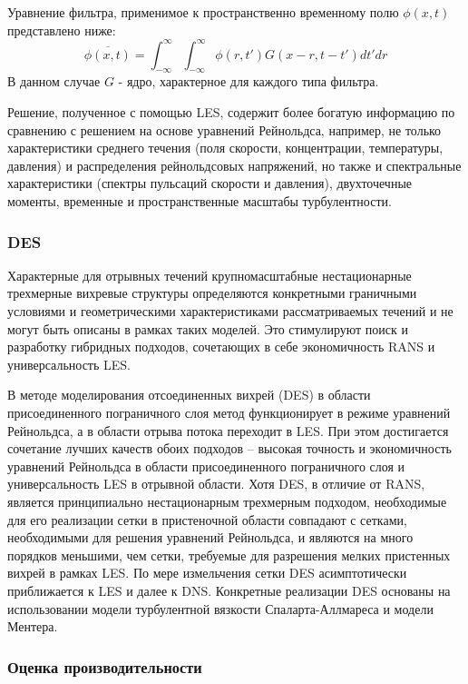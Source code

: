 \documentclass[a4paper]{article}
\begin{document}
		Уравнение фильтра, применимое к пространственно временному полю $\phi(x,t)$ представлено ниже:
		\begin{equation}
			\overline{\phi(x,t)} = \int_{-\infty}^{\infty}\int_{-\infty}^{\infty}\phi(r,t')G(x - r, t - t')dt'dr
		\end{equation}
		В данном случае $G$ - ядро, характерное для каждого типа фильтра.
	
		Решение, полученное с помощью LES, содержит более богатую информацию по сравнению с решением на основе уравнений Рейнольдса, например, не только характеристики среднего течения (поля скорости, концентрации, температуры, давления) и распределения рейнольдсовых напряжений, но также и спектральные характеристики (спектры пульсаций скорости и давления), двухточечные моменты, временные и пространственные масштабы турбулентности.
	
	\subsubsection{DES}
	
		Характерные для отрывных течений крупномасштабные нестационарные трехмерные вихревые структуры определяются конкретными граничными условиями и геометрическими характеристиками рассматриваемых течений и не могут быть описаны в рамках таких моделей. Это стимулируют поиск и разработку гибридных подходов, сочетающих в себе экономичность RANS и универсальность LES.
		
		В методе моделирования отсоединенных вихрей (DES) в области присоединенного пограничного слоя метод функционирует в режиме уравнений Рейнольдса, а в области отрыва потока переходит в LES. При этом достигается сочетание лучших качеств обоих подходов -- высокая точность и экономичность уравнений Рейнольдса в области присоединенного пограничного слоя и универсальность LES в отрывной области. Хотя DES, в отличие от RANS, является принципиально нестационарным трехмерным подходом, необходимые для его реализации сетки в пристеночной области совпадают с сетками, необходимыми для решения уравнений Рейнольдса, и являются на много порядков меньшими, чем сетки, требуемые для разрешения мелких пристенных вихрей в рамках LES. По мере измельчения сетки DES асимптотически приближается к LES и далее к DNS. Конкретные реализации DES основаны на использовании модели турбулентной вязкости Спаларта-Аллмареса и модели Ментера\cite{Strelets2001}.
	
	\subsubsection{Оценка производительности}
	
\end{document}
